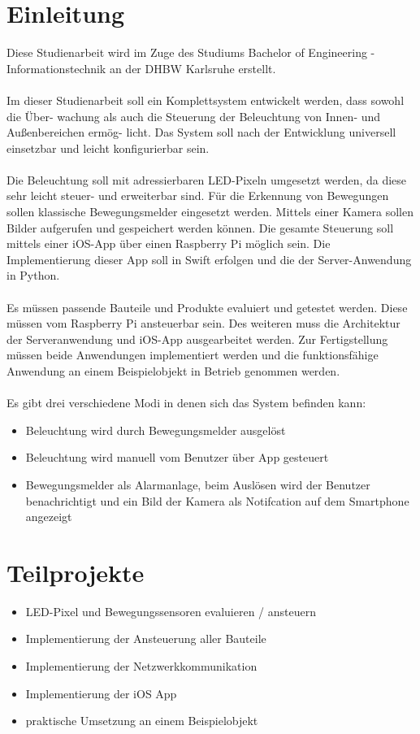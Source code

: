 
\section{Einleitung}
Diese Studienarbeit wird im Zuge des Studiums Bachelor of Engineering - Informationstechnik an der DHBW Karlsruhe erstellt. \\\\
Im dieser Studienarbeit soll ein Komplettsystem entwickelt werden, dass sowohl die Über- wachung als auch die Steuerung der Beleuchtung von Innen- und Außenbereichen ermög- licht. Das System soll nach der Entwicklung universell einsetzbar und leicht konfigurierbar sein.\\\\
Die Beleuchtung soll mit adressierbaren LED-Pixeln umgesetzt werden, da diese sehr leicht steuer- und erweiterbar sind. Für die Erkennung von Bewegungen sollen klassische Bewegungsmelder eingesetzt werden. Mittels einer Kamera sollen Bilder aufgerufen und gespeichert werden können. Die gesamte Steuerung soll mittels einer iOS-App über einen Raspberry Pi möglich sein. Die Implementierung dieser App soll in Swift erfolgen und die der Server-Anwendung in Python.  \\\\
Es müssen passende Bauteile und Produkte evaluiert und getestet werden. Diese müssen vom Raspberry Pi ansteuerbar sein. Des weiteren muss die Architektur der Serveranwendung und iOS-App ausgearbeitet werden. Zur Fertigstellung müssen beide Anwendungen implementiert werden und die funktionsfähige Anwendung an einem Beispielobjekt in Betrieb genommen werden.\\\\
Es gibt drei verschiedene Modi in denen sich das System befinden kann:
\begin{itemize}
\item Beleuchtung wird durch Bewegungsmelder ausgelöst
\item Beleuchtung wird manuell vom Benutzer über App gesteuert 
\item Bewegungsmelder als Alarmanlage, beim Auslösen wird der Benutzer benachrichtigt und ein Bild der Kamera als Notifcation auf dem Smartphone angezeigt
\end{itemize}

\section{Teilprojekte}
\begin{itemize}
\item LED-Pixel und Bewegungssensoren evaluieren / ansteuern
\item Implementierung der Ansteuerung aller Bauteile
\item Implementierung der Netzwerkkommunikation
\item Implementierung der iOS App
\item praktische Umsetzung an einem Beispielobjekt
\end{itemize}

